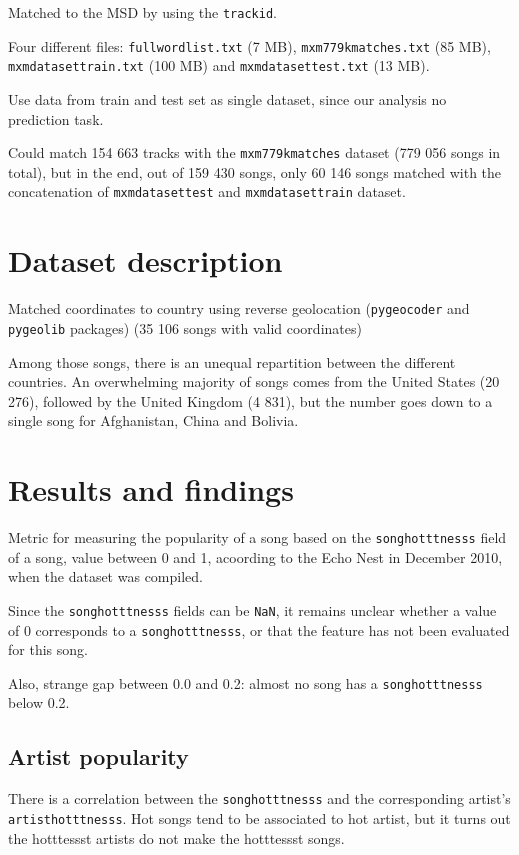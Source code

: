 \documentclass[11pt]{article}
\renewcommand\_{\textunderscore\allowbreak}
\begin{document}
Matched to the MSD by using the \texttt{track\_id}.

Four different files: 
\texttt{full\_word\_list.txt} (7 MB), \texttt{mxm\_779k\_matches.txt} (85 MB), \texttt{mxm\_dataset\_train.txt} (100 MB) and \texttt{mxm\_dataset\_test.txt} (13 MB).

Use data from train and test set as single dataset, since our analysis no prediction task.

Could match 154 663 tracks with the \texttt{mxm\_779k\_matches} dataset (779 056 songs in total), but in the end, out of 159 430 songs, only 60 146 songs matched with the concatenation of \texttt{mxm\_dataset\_test} and \texttt{mxm\_dataset\_train} dataset.

\section{Dataset description}

Matched coordinates to country using reverse geolocation (\texttt{pygeocoder} and \texttt{pygeolib} packages) (35 106 songs with valid coordinates)

Among those songs, there is an unequal repartition between the different countries.
An overwhelming majority of songs comes from the United States (20 276), followed by the United Kingdom (4 831), but the number goes down to a single song for Afghanistan, China and Bolivia.


\section{Results and findings}
Metric for measuring the popularity of a song based on the \texttt{song\_hotttnesss} field of a song, value between 0 and 1, acoording to the Echo Nest in December 2010, when the dataset was compiled.

Since the \texttt{song\_hotttnesss} fields can be \texttt{NaN}, it remains unclear whether a value of 0 corresponds to a \texttt{song\_hotttnesss}, or that the feature has not been evaluated for this song. 

Also, strange gap between 0.0 and 0.2: almost no song has a \texttt{song\_hotttnesss} below 0.2.


\subsection{Artist popularity}
There is a correlation between the \texttt{song\_hotttnesss} and the corresponding artist's \texttt{artist\_hotttnesss}.
Hot songs tend to be associated to hot artist, but it turns out the hotttessst artists do not make the hotttessst songs.
\end{document}
